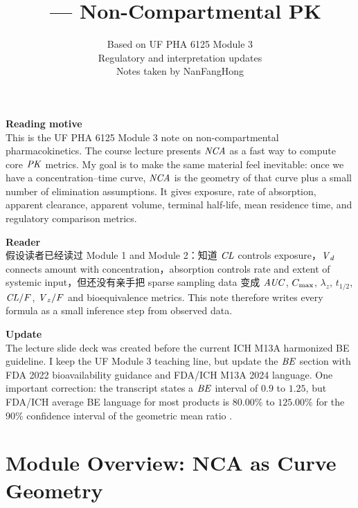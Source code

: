 \documentclass[a4paper]{article}
\title{\npart\ --- Non-Compartmental PK}
\author{Based on UF PHA 6125 Module 3\\\small Regulatory and interpretation updates\\\small Notes taken by NanFangHong}
\newcommand{\CL}{\ensuremath{\pksym{CL}}}
\newcommand{\CLF}{\ensuremath{\pksym{CL}/F}}
\newcommand{\Vd}{\ensuremath{\pksym{V}_d}}
\newcommand{\VzF}{\ensuremath{\pksym{V}_z/F}}
\newcommand{\AUC}{\ensuremath{\pksym{AUC}}}
\newcommand{\Cmax}{\ensuremath{C_{\pklab{max}}}}
\newcommand{\lambdaZ}{\ensuremath{\lambda_z}}
\newcommand{\halfLife}{\ensuremath{t_{1/2}}}
\newcommand{\PK}{\ensuremath{\pksym{PK}}}
\newcommand{\NCA}{\ensuremath{\pksym{NCA}}}
\newcommand{\BE}{\ensuremath{\pksym{BE}}}
\begin{document}
\maketitle
{\small
  \noindent\textbf{Reading motive}\\
  This is the UF PHA 6125 Module 3 note on non-compartmental pharmacokinetics. The course lecture presents \NCA{} as a fast way to compute core \PK{} metrics. My goal is to make the same material feel inevitable: once we have a concentration--time curve, \NCA{} is the geometry of that curve plus a small number of elimination assumptions. It gives exposure, rate of absorption, apparent clearance, apparent volume, terminal half-life, mean residence time, and regulatory comparison metrics.
  \begin{flushright}\end{flushright}

  \vspace{5pt}
  \noindent\textbf{Reader}\\
  假设读者已经读过 Module 1 and Module 2：知道 \CL{} controls exposure，\Vd{} connects amount with concentration，absorption controls rate and extent of systemic input，但还没有亲手把 sparse sampling data 变成 \AUC{}, \Cmax{}, \lambdaZ{}, \halfLife{}, \CLF{}, \VzF{} and bioequivalence metrics. This note therefore writes every formula as a small inference step from observed data.
  \begin{flushright}\end{flushright}

  \vspace{5pt}
  \noindent\textbf{Update}\\
  The lecture slide deck was created before the current ICH M13A harmonized BE guideline. I keep the UF Module 3 teaching line, but update the \BE{} section with FDA 2022 bioavailability guidance and FDA/ICH M13A 2024 language. One important correction: the transcript states a \BE{} interval of \(0.9\) to \(1.25\), but FDA/ICH average BE language for most products is \(80.00\%\) to \(125.00\%\) for the 90\% confidence interval of the geometric mean ratio \cite{fda2001StatisticalBioequivalence,ichM13A2024Bioequivalence}.
  \begin{flushright}[2026 view]\end{flushright}
}

\tableofcontents

\section{Module Overview: NCA as Curve Geometry}
\end{document}
